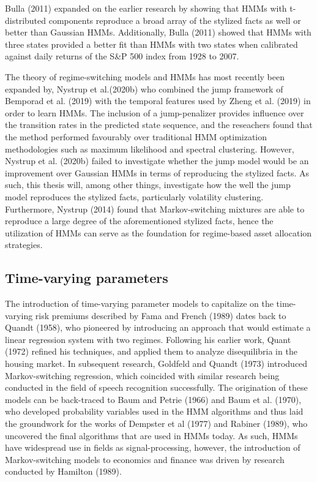 Bulla (2011) expanded on the earlier research by showing that HMMs with t-distributed components reproduce a broad array of the stylized facts as well or better than Gaussian HMMs. Additionally, Bulla (2011) showed that HMMs with three states provided a better fit than HMMs with two states when calibrated against daily returns of the S\&P 500 index from 1928 to 2007. 

The theory of regime-switching models and HMMs has most recently been expanded by, Nystrup et al.(2020b) who combined the jump framework of Bemporad et al. (2019) with the temporal features used by Zheng et al. (2019) in order to learn HMMs. The inclusion of a jump-penalizer provides influence over the transition rates in the predicted state sequence, and the reseachers found that the method performed favourably over traditional HMM optimization methodologies such as maximum likelihood and spectral clustering. However, Nystrup et al. (2020b) failed to investigate whether the jump model would be an improvement over Gaussian HMMs in terms of reproducing the stylized facts. As such, this thesis will, among other things, investigate how the well the jump model reproduces the stylized facts, particularly volatility clustering. Furthermore, Nystrup (2014) found that Markov-switching mixtures are able to reproduce a large degree of the aforementioned stylized facts, hence the utilization of HMMs can serve as the foundation for regime-based asset allocation strategies. 


\subsection*{Time-varying parameters}
The introduction of time-varying parameter models to capitalize on the time-varying risk premiums described
by Fama and French (1989) dates back to Quandt (1958), who pioneered by introducing an approach that would estimate a linear regression system with two regimes. Following his earlier work, Quant (1972) refined his techniques, and applied them to analyze disequilibria in the housing market. In subsequent research, Goldfeld and Quandt (1973) introduced Markov-switching regression, which coincided with similar research being conducted in the field of speech recognition successfully. The origination of these models can be back-traced to Baum and Petrie (1966) and Baum et al. (1970), who developed probability variables used in the HMM algorithms and thus laid the groundwork for the works of Dempster et al (1977) and Rabiner (1989), who uncovered the final algorithms that are used in HMMs today. As such, HMMs have widespread use in fields as signal-processing, however, the introduction of Markov-switching models to economics and finance was driven by research conducted by Hamilton (1989).

